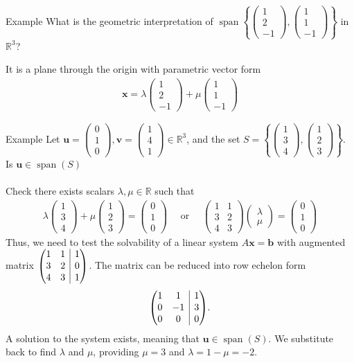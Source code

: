 \documentclass{report}
\makeatletter
\renewcommand{\vec}{\mathbf}
\newcommand{\Span}{\operatorname{span}}
\newenvironment{amatrix}[1]{%
  \left(\begin{array}{@{}*{#1}{c}|c@{}}
}{%
  \end{array}\right)
}
\newcommand{\cvec}[1]{ \begin{pmatrix} #1 \end{pmatrix} }
\makeatother
\begin{document}
\begin{enumerate}
		\begin{question}{Example}
			What is the geometric interpretation of $\Span \left\{\cvec{1\\2\\-1},\cvec{1\\1\\-1}\right\}$ in $\mathbb{R}^3$?

			It is a plane through the origin with parametric vector form
			\begin{align*}
				\vec{x} = \lambda \cvec{1\\2\\-1} + \mu \cvec{1\\1\\-1}
			\end{align*}
		\end{question}

		\begin{question}{Example}
			Let $\vec{u} = \cvec{0\\1\\0}, \vec{v} = \cvec{1\\4\\1} \in \mathbb{R}^3$, and the set $S = \left\{\cvec{1\\3\\4},\cvec{1\\2\\3}\right\}$. Is $\vec{u} \in \Span(S)$
			\\ \\
			Check there exists scalars $\lambda, \mu \in \mathbb{R}$ such that
			\begin{align*}
				\lambda \cvec{1\\3\\4} + \mu \cvec{1\\2\\3} = \cvec{0\\1\\0} \quad \text{ or } \quad \cvec{1&1\\3&2\\4&3} \cvec{\lambda\\\mu} = \cvec{0\\1\\0}
			\end{align*}
			Thus, we need to test the solvability of a linear system $A\vec{x} = \vec{b}$ with augmented matrix $\begin{amatrix}{2}
				1 & 1 & 1 \\
				3 & 2 & 0 \\
				4 & 3 & 1
			\end{amatrix}$.
			The matrix can be reduced into row echelon form
			\begin{align*}
				\begin{amatrix}{2}
					1 & 1 & 1	\\
					0 & -1 & 3	\\
					0 & 0 & 0	
				\end{amatrix}.
			\end{align*}
			A solution to the system exists, meaning that $\vec{u} \in \Span(S)$. We substitute back to find $\lambda$ and $\mu$, providing $\mu = 3$ and $\lambda = 1 - \mu = -2$.


\end{question}
\end{enumerate}
\end{document}
